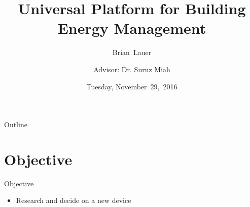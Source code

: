 \documentclass{beamer}
\title[Progress Update]{Universal Platform for Building Energy Management}
\author[B.~Lauer]{Brian~Lauer \\\and
Advisor: Dr. Suruz Miah}
\institute[Bradley University] %
{
  Department of Electrical and Computer Engineering\\
  Bradley University\\
  1501 W. Bradley Avenue\\
  Peoria, IL, 61625, USA
}
\date[November~29,~2016]{Tuesday, November~29,~2016}
\begin{document}
\begin{frame}
  \titlepage
\end{frame}

\begin{frame}{Outline}
  \tableofcontents
\end{frame}

\section{Objective}
\begin{frame}{Objective}
\begin{itemize}
\item Research and decide on a new device 
\end{itemize}
\end{frame}
\end{document}
